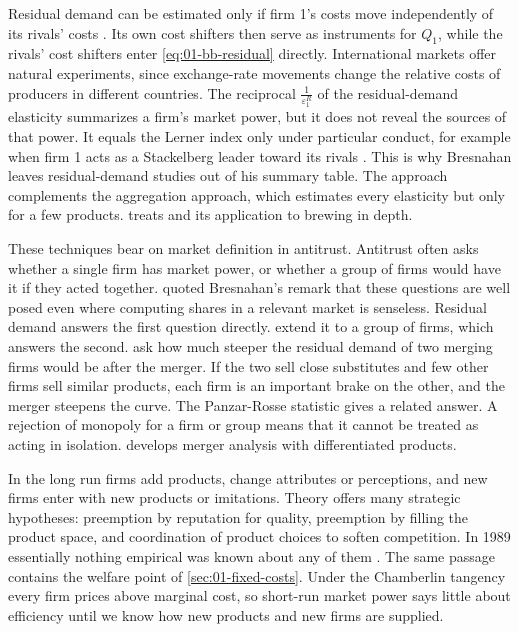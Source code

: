 Residual demand can be estimated only if firm 1's costs move independently of its rivals' costs
\citep[fn.~43]{Bresnahan1989}. Its own cost shifters then serve as instruments for $Q_1$, while the rivals' cost
shifters enter \eqref{eq:01-bb-residual} directly. International markets offer natural experiments, since exchange-rate
movements change the relative costs of producers in different countries. The reciprocal
$\frac{1}{\varepsilon^{R}_1}$ of the residual-demand elasticity summarizes a firm's market power, but it does not reveal the sources of that power. It
equals the Lerner index only under particular conduct, for example when firm 1 acts as a Stackelberg leader toward
its rivals \citep[p.~289]{BakerBresnahan1988}. This is why Bresnahan leaves residual-demand studies out of his summary
table. The approach complements the
aggregation approach, which estimates every elasticity but only for a few products.  treats
\citet{BakerBresnahan1988} and its application to brewing in depth.

These techniques bear on market definition in antitrust. Antitrust often asks whether a single firm has market power,
or whether a group of firms would have it if they acted together.  quoted Bresnahan's
remark that these questions are well posed even where computing shares in a relevant market is senseless. Residual
demand answers the first question directly. \citet{ScheffmanSpiller1987} extend
it to a group of firms, which answers the second. \citet{BakerBresnahan1985} ask how much steeper the residual demand of
two merging firms would be after the merger. If the two sell close substitutes and few other firms sell similar products,
each firm is an important brake on the other, and the merger steepens the curve. The Panzar-Rosse statistic gives a
related answer. A rejection of monopoly for a firm or group means that it cannot be treated as acting in isolation.
 develops merger analysis with differentiated products.

In the long run firms add products, change attributes or perceptions, and new firms enter with new products or
imitations. Theory offers many strategic hypotheses: preemption by reputation for quality, preemption by filling the
product space, and coordination of product choices to soften competition. In 1989 essentially nothing empirical was known
about any of them \citep[p.~1050]{Bresnahan1989}. The same passage contains the welfare point of
\cref{sec:01-fixed-costs}. Under the Chamberlin tangency every firm prices above marginal cost, so short-run market power
says little about efficiency until we know how new products and new firms are supplied.

